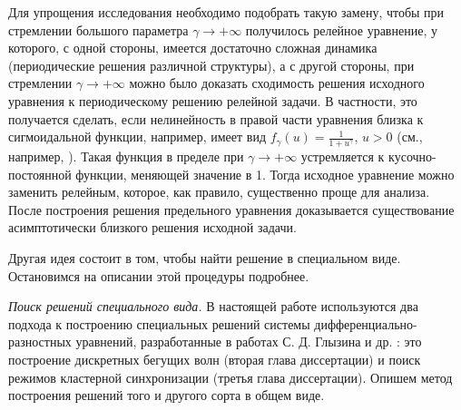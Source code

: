 Для упрощения исследования необходимо подобрать такую замену, чтобы при стремлении большого параметра $\gamma \to +\infty$ получилось релейное уравнение, у которого, с одной стороны, имеется достаточно сложная динамика (периодические решения различной структуры), а с другой стороны, при стремлении $\gamma \to +\infty$ можно было доказать сходимость решения исходного уравнения к периодическому решению релейной задачи. В частности, это получается сделать, если нелинейность в правой части уравнения близка к сигмоидальной функции, например, имеет вид $f_\gamma(u)=\frac{1}{1 + u^\gamma}$, $u > 0$ (см., например, \cite{Preobrazhenskaya2020, Glyzin2017, Krisztin2020, Bartha2021}). Такая функция в пределе при $\gamma\to+\infty$ устремляется к кусочно-постоянной функции, меняющей значение в 1. Тогда исходное уравнение можно заменить релейным, которое, как правило, существенно проще для анализа. После построения решения предельного уравнения доказывается существование асимптотически близкого решения исходной задачи.

Другая идея состоит в том, чтобы найти решение в специальном виде. Остановимся на описании этой процедуры подробнее.


\textit{Поиск решений специального вида.} В настоящей работе используются два подхода к построению специальных решений системы дифференциально-разностных уравнений, разработанные в работах С. Д. Глызина и др. \cite{GlyKol2013, GlyKol2013a, Glyzin2014}: это построение дискретных бегущих волн (вторая глава диссертации) и поиск режимов кластерной синхронизации (третья глава диссертации). Опишем метод построения решений того и другого сорта в общем виде.


